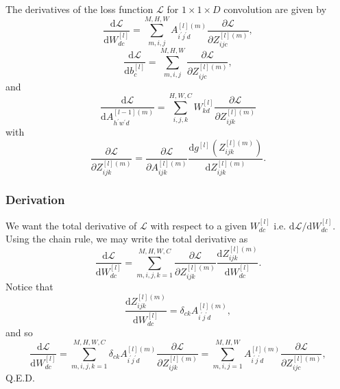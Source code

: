 \documentclass[modern]{aastex61}
\newcommand{\uderivative}{\mathrm{d}}
\begin{document}
The derivatives of the loss function $\mathscr{L}$ for $1 \times 1 \times D$ convolution are given by
\begin{equation} \label{eq:conv11dW}
  \frac{\uderivative \mathscr{L}}{\uderivative W^{[l]}_{dc}} = \sum_{m,i,j}^{M,H,W} A^{[l](m)}_{i^{'}j^{'}d} \frac{\partial \mathscr{L}}{\partial Z^{[l](m)}_{ijc}},
\end{equation}
\begin{equation} \label{eq:conv11db}
  \frac{\uderivative \mathscr{L}}{\uderivative b^{[l]}_{c}} = \sum_{m,i,j}^{M,H,W} \frac{\partial \mathscr{L}}{\partial Z^{[l](m)}_{ijc}},
\end{equation}
and
\begin{equation} \label{eq:conv11dA_lMinus}
  \frac{\uderivative \mathscr{L}}{\uderivative A^{[l-1](m)}_{h^{'}w^{'}d}} = \sum_{i,j,k}^{H,W,C} W^{[l]}_{kd}  \frac{\partial \mathscr{L}}{\partial Z^{[l](m)}_{ijk}}
\end{equation}
with
\begin{equation} \label{eq:conv11dZ}
  \frac{\partial \mathscr{L}}{\partial Z^{[l](m)}_{ijk}} = \frac{\partial \mathscr{L}}{\partial A^{[l](m)}_{ijk}} \frac{\uderivative g^{[l]}(Z^{[l](m)}_{ijk})}{\uderivative Z^{[l](m)}_{ijk}}.
\end{equation}

\subsubsection{Derivation}

We want the total derivative of $\mathscr{L}$ with respect to a given $W^{[l]}_{dc}$ i.e. $\uderivative \mathscr{L}/\uderivative W^{[l]}_{dc}$. Using the chain rule, we may write the total derivative as
\begin{equation*}
  \frac{\uderivative \mathscr{L}}{\uderivative W^{[l]}_{dc}} = \sum_{m,i,j,k=1}^{M,H,W,C} \frac{\partial \mathscr{L}}{\partial Z^{[l](m)}_{ijk}} \frac{\uderivative Z^{[l](m)}_{ijk}}{\uderivative W^{[l]}_{dc}}.
\end{equation*}
Notice that
\begin{equation*}
  \frac{\uderivative Z^{[l](m)}_{ijk}}{\uderivative W^{[l]}_{dc}} = \delta_{ck}A^{[l](m)}_{i^{'}j^{'}d},
\end{equation*}
and so
\begin{equation*}
  \frac{\uderivative \mathscr{L}}{\uderivative W^{[l]}_{dc}} = \sum_{m,i,j,k=1}^{M,H,W,C} \delta_{ck}A^{[l](m)}_{i^{'}j^{'}d} \frac{\partial \mathscr{L}}{\partial Z^{[l](m)}_{ijk}} = \sum_{m,i,j=1}^{M,H,W} A^{[l](m)}_{i^{'}j^{'}d} \frac{\partial \mathscr{L}}{\partial Z^{[l](m)}_{ijc}},
\end{equation*}
Q.E.D.
\end{document}
